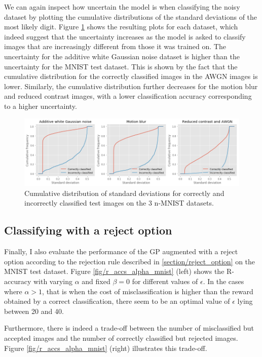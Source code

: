 \documentclass{article}
\begin{document}
We can again inspect how uncertain the model is when classifying the noisy dataset by plotting the cumulative distributions of the standard deviations of the most likely digit. Figure \ref{fig/noisy_mnist_cum_stds} shows the resulting plots for each dataset, which indeed suggest that the uncertainty increases as the model is asked to classify images that are increasingly different from those it was trained on. The uncertainty for the additive white Gaussian noise dataset is higher than the uncertainty for the MNIST test dataset. This is shown by the fact that the cumulative distribution for the correctly classified images in the AWGN images is lower. Similarly, the cumulative distribution further decreases for the motion blur and reduced contrast images, with a lower classification accuracy corresponding to a higher uncertainty.

\begin{figure}[H]
	\centering
	\includegraphics[scale=0.4]{noisy_mnist_cum_stds}
	\caption{Cumulative distribution of standard deviations for correctly and incorrectly classified test images on the 3 n-MNIST datasets.}
	\label{fig/noisy_mnist_cum_stds}
\end{figure}


\subsection{Classifying with a reject option}
Finally, I also evaluate the performance of the GP augmented with a reject option according to the rejection rule described in \ref{section/reject_option} on the MNIST test dataset. Figure \ref{fig/r_accs_alpha_mnist} (left) shows the R-accuracy with varying $\alpha$ and fixed $\beta=0$ for different values of $\epsilon$. In the cases where $\alpha > 1$, that is when the cost of misclassification is higher than the reward obtained by a correct classification, there seem to be an optimal value of $\epsilon$ lying between 20 and 40. 

Furthermore, there is indeed a trade-off between the number of misclassified but accepted images and the number of correctly classified but rejected images. Figure \ref{fig/r_accs_alpha_mnist} (right) illustrates this trade-off.
\end{document}

